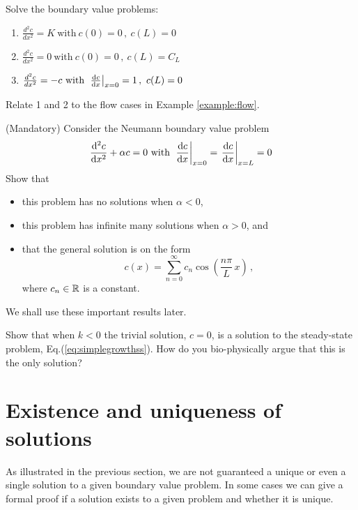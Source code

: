 \begin{exerciseregion}
  
\begin{exercise}
  Solve the boundary value problems:
  \begin{enumerate}
  \item  
    $\frac{d^2c}{dx^2} = K \ \text{with} \  c(0) =0\, , \ c(L)=0$

   \item 
    $\frac{d^2c}{dx^2} = 0 \ \text{with} \ c(0)=0\, , \ c(L)=C_L $
  \item 
    $\frac{d^2c}{dx^2} = -c \ \text{with} \  \left.\frac{\mathrm{d} c}{\mathrm{d} x}\right|_{x=0} =1\, , \ c(L)=0$
  \end{enumerate}
  Relate 1 and 2 to the flow cases in Example \ref{example:flow}.
\end{exercise}

\begin{exercise}
	\label{exercise:ststneumann}
	(Mandatory) Consider the Neumann boundary value problem
	\begin{eqnarray}
		\frac{\mathrm{d}^2c}{\mathrm{d} x^2} + \alpha c = 0 \ \text{with} \  \left.\frac{\mathrm{d} c}{\mathrm{d} x}\right|_{x=0} = \left.\frac{\mathrm{d} c}{\mathrm{d} x}\right|_{x=L} =0
	\end{eqnarray}
	Show that   
	\begin{itemize}
		\item this problem has no solutions when $\alpha < 0$, 
		\item this problem has infinite many solutions when $\alpha > 0$, and
		\item that the general solution is on the form
		\begin{equation}
			\label{eq:2ndorderseriescosine}	c(x) = \sum_{n=0}^\infty c_n \cos\left(\frac{n\pi}{L} \, x \right) \, ,
		\end{equation}
		where $c_n \in \mathbb{R}$ is a constant.
	\end{itemize}
	 We shall use these important results later. 
\end{exercise}
\begin{exercise}
  Show that when $k<0$ the trivial solution, $c=0$, is a solution to the steady-state
  problem, Eq.(\ref{eq:simplegrowthss}). How do you bio-physically argue that
	this is the only solution?
\end{exercise}

\end{exerciseregion}


\section{Existence and uniqueness of solutions} \label{sect:uniq}
As illustrated in the previous section, we are not guaranteed a unique or even a single solution 
to a given boundary value problem. In some cases we can give a formal proof if a solution exists to 
a given problem and whether it is unique. 

